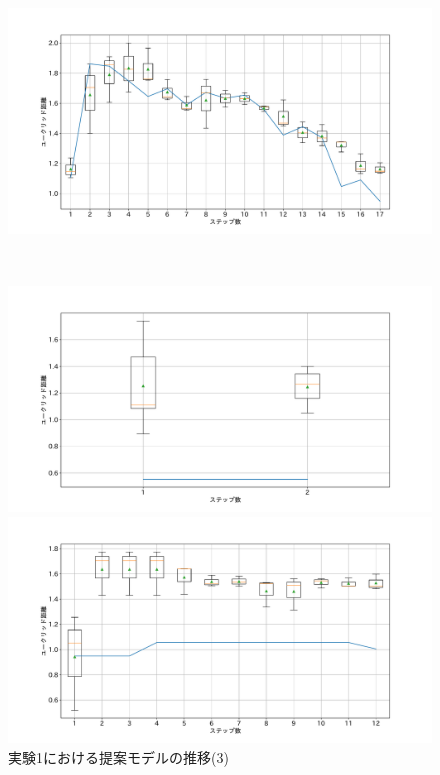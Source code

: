 \begin{figure}[h]
\begin{minipage}[b]{0.48\linewidth}
 \end{minipage}
 \begin{minipage}[b]{0.48\linewidth}
  \centering
  \includegraphics[scale=0.15]{./imgs/gaChange/cake2_10.pdf}
 \end{minipage}\\
 \begin{minipage}[b]{0.48\linewidth}
  \centering
  \includegraphics[scale=0.15]{./imgs/gaChange/cake1_11.pdf}
 \end{minipage}
 \begin{minipage}[b]{0.48\linewidth}
  \centering
  \includegraphics[scale=0.15]{./imgs/gaChange/cake2_11.pdf}
 \end{minipage}
 \caption{実験1における提案モデルの推移(3)}\label{fig:gaChange1_3}
\end{figure}

